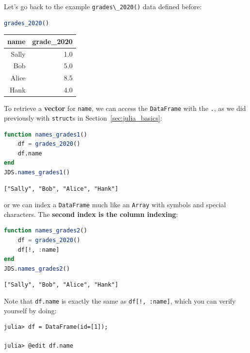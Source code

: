 \documentclass[
  notoc %
]{tufte-book}
\newcommand{\passthrough}[1]{#1}
\begin{document}
Let's go back to the example \passthrough{\lstinline!grades\_2020()!}
data defined before:

\begin{lstlisting}[language=Julia]
grades_2020()
\end{lstlisting}

\begin{longtable}[]{@{}rr@{}}
\toprule
name & grade\_2020 \\
\midrule
\endhead
Sally & 1.0 \\
Bob & 5.0 \\
Alice & 8.5 \\
Hank & 4.0 \\
\bottomrule
\end{longtable}

To retrieve a \textbf{vector} for \passthrough{\lstinline!name!}, we can
access the \passthrough{\lstinline!DataFrame!} with the
\passthrough{\lstinline!.!}, as we did previously with
\passthrough{\lstinline!struct!}s in Section~\ref{sec:julia_basics}:

\begin{lstlisting}[language=Julia]
function names_grades1()
    df = grades_2020()
    df.name
end
JDS.names_grades1()
\end{lstlisting}

\begin{lstlisting}[language=Output]
["Sally", "Bob", "Alice", "Hank"]
\end{lstlisting}

or we can index a \passthrough{\lstinline!DataFrame!} much like an
\passthrough{\lstinline!Array!} with symbols and special characters. The
\textbf{second index is the column indexing}:

\begin{lstlisting}[language=Julia]
function names_grades2()
    df = grades_2020()
    df[!, :name]
end
JDS.names_grades2()
\end{lstlisting}

\begin{lstlisting}[language=Output]
["Sally", "Bob", "Alice", "Hank"]
\end{lstlisting}

Note that \passthrough{\lstinline!df.name!} is exactly the same as
\passthrough{\lstinline"df[!, :name]"}, which you can verify yourself by
doing:

\begin{lstlisting}
julia> df = DataFrame(id=[1]);

julia> @edit df.name
\end{lstlisting}
\end{document}
